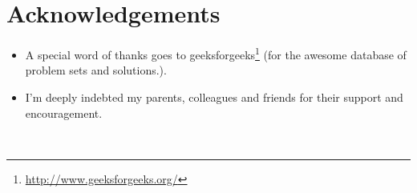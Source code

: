\section*{Acknowledgements}
\begin{itemize}
\item A special word of thanks goes to geeksforgeeks\footnote{\url{http://www.geeksforgeeks.org/}} (for the awesome database of problem sets and solutions.).
\item I'm deeply indebted my parents, colleagues and friends for their support and encouragement.
\end{itemize}
\mbox{}\\
